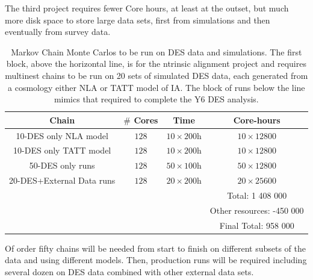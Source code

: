 \documentclass[12pt]{article}
\begin{document}
\begin{small}
The third project requires fewer Core hours, at least at the outset, but much more disk space to store large data sets, first from simulations and then eventually from survey data. 



\begin{table}[h!]
\begin{center}
\begin{tabular}{c|cc|c}
 Chain         & $\#$ Cores &  Time & Core-hours   \\ 
\hline
10-DES only NLA model & $128$ & $10\times200$h & $10\times12800$  \\ 
10-DES only TATT model & $128$ & $10\times200$h & $10\times12800$  \\  
\hline
 50-DES only runs & $128$ & $50\times100$h & $50\times12800$  \\  
 20-DES+External Data runs & $128$ & $20\times200$h & $20\times25600$  \\  
\hline
& &  & Total: 1 408 000\\
& &  & Other resources: -450 000\\
& &  & Final Total: 958 000\\
\end{tabular}


\caption{Markov Chain Monte Carlos to be run on DES data and simulations. The first block, above the horizontal line, is for the ntrinsic alignment project and requires multinest chains to be run on 20 sets of simulated DES data, each generated from a cosmology either NLA or TATT model of IA. %
The block of runs below the line mimics that required to complete the Y6 DES analysis.} Of order fifty chains will be needed from start to finish on different subsets of the data and using different models. Then, production runs will be required including several dozen on DES data combined with other external data sets.
\label{tab:post}
\end{center}
\end{table}



\end{small}
\end{document}
